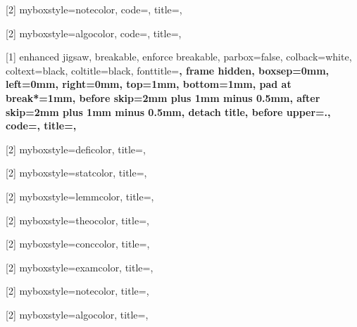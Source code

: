 [2]{
    myboxstyle=notecolor,
    code={},
    title={},
}

[2]{
    myboxstyle=algocolor,
    code={},
    title={},
}

[1]{
    enhanced jigsaw,
    breakable,
    enforce breakable,
    parbox=false,
    colback=white,
    coltext=black,
    coltitle=black,
    fonttitle=\normalfont\bfseries,
    frame hidden,
    boxsep=0mm,
    left=0mm,
    right=0mm,
    top=1mm,
    bottom=1mm,
    pad at break*=1mm,
    before skip=2mm plus 1mm minus 0.5mm,
    after skip=2mm plus 1mm minus 0.5mm,
    detach title,
    before upper={\noindent\tcbtitle.\nobreakspace\ignorespaces},
    code={},
    title={\thecommonThmCounter},
}



[2]{
    myboxstyle=deficolor,
    title={},
}

[2]{
    myboxstyle=statcolor,
    title={},
}

[2]{
    myboxstyle=lemmcolor,
    title={},
}

[2]{
    myboxstyle=theocolor,
    title={},
}

[2]{
    myboxstyle=conccolor,
    title={},
}

[2]{
    myboxstyle=examcolor,
    title={},
}

[2]{
    myboxstyle=notecolor,
    title={},
}

[2]{
    myboxstyle=algocolor,
    title={},
}



